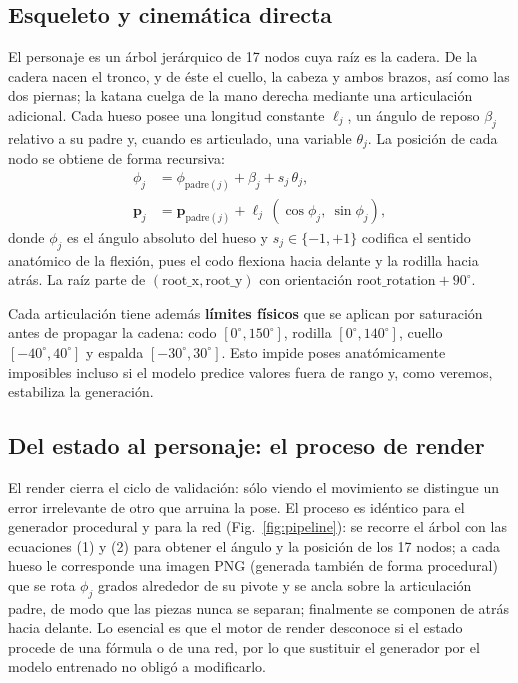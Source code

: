 \documentclass[10pt,twocolumn]{article}
\begin{document}
\subsection{Esqueleto y cinemática directa}
El personaje es un árbol jerárquico de 17 nodos cuya raíz es la cadera. De la
cadera nacen el tronco, y de éste el cuello, la cabeza y ambos brazos, así como
las dos piernas; la katana cuelga de la mano derecha mediante una articulación
adicional. Cada hueso posee una longitud constante $\ell_j$, un ángulo de reposo
$\beta_j$ relativo a su padre y, cuando es articulado, una variable
$\theta_j$. La posición de cada nodo se obtiene de forma recursiva:
\begin{align}
\phi_j &= \phi_{\text{padre}(j)} + \beta_j + s_j\,\theta_j, \\
\mathbf{p}_j &= \mathbf{p}_{\text{padre}(j)} + \ell_j\,(\cos\phi_j,\ \sin\phi_j),
\end{align}
donde $\phi_j$ es el ángulo absoluto del hueso y $s_j\in\{-1,+1\}$ codifica el
sentido anatómico de la flexión, pues el codo flexiona hacia delante y la rodilla
hacia atrás. La raíz parte de $(\text{root\_x},\text{root\_y})$ con orientación
$\text{root\_rotation}+90^\circ$.

Cada articulación tiene además \textbf{límites físicos} que se aplican por
saturación antes de propagar la cadena: codo $[0^\circ,150^\circ]$, rodilla
$[0^\circ,140^\circ]$, cuello $[-40^\circ,40^\circ]$ y espalda
$[-30^\circ,30^\circ]$. Esto impide poses anatómicamente imposibles incluso si el
modelo predice valores fuera de rango y, como veremos, estabiliza la generación.

\subsection{Del estado al personaje: el proceso de render}
El render cierra el ciclo de validación: sólo viendo el movimiento se distingue un
error irrelevante de otro que arruina la pose. El proceso es idéntico para el
generador procedural y para la red (Fig.~\ref{fig:pipeline}): se recorre el árbol
con las ecuaciones (1) y (2) para obtener el ángulo y la posición de los 17 nodos;
a cada hueso le corresponde una imagen PNG (generada también de forma procedural)
que se rota $\phi_j$ grados alrededor de su pivote y se ancla sobre la articulación
padre, de modo que las piezas nunca se separan; finalmente se componen de atrás
hacia delante. Lo esencial es que el motor de render desconoce si el estado
procede de una fórmula o de una red, por lo que sustituir el generador por el
modelo entrenado no obligó a modificarlo.
\end{document}
